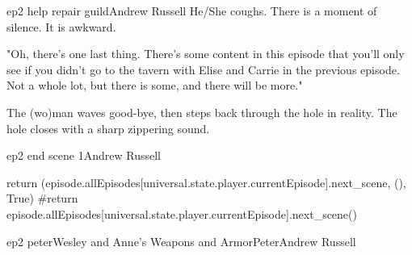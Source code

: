 \documentclass{book}
\begin{document}
\begin{childnode}{ep2 help repair guild}{Andrew Russell}
    He/She coughs. There is a moment of silence. It is awkward.

    "Oh, there's one last thing. There's some content in this episode that you'll only see if you didn't 
    go to the tavern with Elise and Carrie in the previous episode. Not a whole lot, but there is some, and there will be more."

    The (wo)man waves good-bye, then steps back through the hole in reality. The hole closes with a sharp zippering sound.


\end{childnode}

\begin{childnode}{ep2 end scene 1}{Andrew Russell}
    
    \begin{code}

        return (episode.allEpisodes[universal.state.player.currentEpisode].next_scene, (), True)
        #return episode.allEpisodes[universal.state.player.currentEpisode].next_scene()

    \end{code}

\end{childnode}

\begin{node}{ep2 peter}{Wesley and Anne's Weapons and Armor}{Peter}{Andrew Russell}



\end{node}
\end{document}
